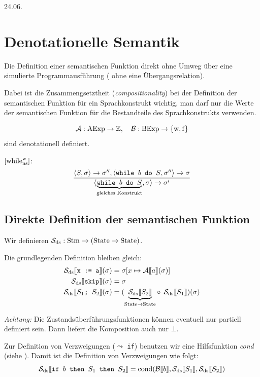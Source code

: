 \newpage
\hfill 24.06.

\section{Denotationelle Semantik}


\begin{remark}[Ziel]
    Die Definition einer semantischen Funktion direkt ohne Umweg über eine simulierte Programmausführung (\dh{} ohne eine Übergangsrelation).

    Dabei ist die Zusammengsetztheit (\emph{compositionality}) bei der Definition der semantischen Funktion für ein Sprachkonstrukt wichtig, \dh{} man darf nur die Werte der semantischen Funktion für die Bestandteile des Sprachkonstrukts verwenden.
\end{remark}

\begin{example}
    \[ \A: \AExp \to \mathbb{Z}, \quad \B: \BExp \to \bool \]
    sind denotationell definiert.
\end{example}

\begin{example}[Gegenbeispiel]
    $\infruleNs[\true]{while}$: \[
        \frac{
            \strans{S}{\sigma}{\sigma''}, \strans{\texttt{while $b$ do $S$}}{\sigma''}{\sigma}
        }{
            \strans{\underbrace{\texttt{while $b$ do $S$}}_{\text{gleiches Konstrukt}}}{\sigma}{\sigma'}
        }
    \]
\end{example}



\subsection{Direkte Definition der semantischen Funktion}

\begin{definition}
    Wir definieren $\mathcal{S}_{\text{ds}} : \Stm \to (\State \to \State)$.

    Die grundlegenden Definition bleiben gleich:
    \begin{align*}
        \Sdssem{\texttt{x := a}}(\sigma) & = \sigma[x \mapsto \Asem{a}(\sigma)] \\
        \Sdssem{\texttt{skip}}(\sigma) & = \sigma \\
        \Sdssem{\texttt{$S_1$; $S_2$}}(\sigma) & = (\underbrace{\Sdssem{S_2}}_{\State \to \State} \circ\;\, \Sdssem{S_1})(\sigma)
    \end{align*}

    \emph{Achtung:} Die Zustandsüberführungsfunktionen können eventuell nur partiell definiert sein. Dann liefert die Komposition auch nur $\bot$.

    Zur Definition von Verzweigungen ($\leadsto$ \texttt{if}) benutzen wir eine Hilfsfunktion \emph{cond} (siehe ). Damit ist die Definition von Verzweigungen wie folgt:
    \[
        \Sdssem{\texttt{if $b$ then $S_1$ then $S_2$}} = \cond(\Bsem{b}, \Sdssem{S_1}, \Sdssem{S_2})
    \]
\end{definition}


